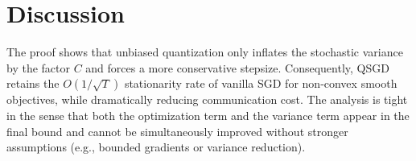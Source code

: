 \documentclass{article}
\begin{document}
\section*{Discussion}
The proof shows that unbiased quantization only inflates the stochastic variance by the factor $C$ and forces a more conservative stepsize.  Consequently, QSGD retains the $O(1/\sqrt{T})$ stationarity rate of vanilla SGD for non‑convex smooth objectives, while dramatically reducing communication cost.  The analysis is tight in the sense that both the optimization term and the variance term appear in the final bound and cannot be simultaneously improved without stronger assumptions (e.g., bounded gradients or variance reduction).
\end{document}
